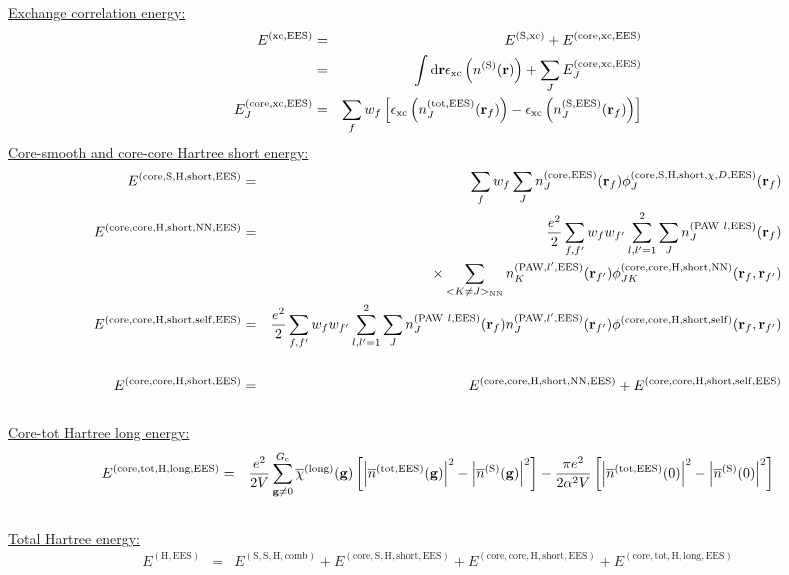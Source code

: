 \documentclass[paper=a4, fontsize=11pt]{article} %
\numberwithin{equation}{section} %
\numberwithin{figure}{section} %
\numberwithin{table}{section} %
\newcommand{\ol}{\overline}
\newcommand{\bg}{{\bf{g}}}
\newcommand{\br}{{\bf{r}}}
\newcommand{\rS}{{\mathrm{S}}}
\newcommand{\rEES}{{\mathrm{EES}}}
\newcommand{\rxc}{{\mathrm{xc}}}
\newcommand{\rcore}{{\mathrm{core}}}
\newcommand{\rNN}{{\mathrm{NN}}}
\newcommand{\rself}{{\mathrm{self}}}
\newcommand{\rshort}{{\mathrm{short}}}
\newcommand{\rlong}{{\mathrm{long}}}
\newcommand{\rP}{{\mathrm{PAW}}}
\newcommand{\rd}{{\mathrm{d}}}
\newcommand{\rH}{{\mathrm{H}}}
\newcommand{\rcomb}{{\mathrm{comb}}}
\newcommand{\rtot}{{\mathrm{tot}}}
\newcommand{\Gc}{{G_{\mathrm{c}}}}
\begin{document}
\underline{Exchange correlation energy:}
\begin{eqnarray}
E^{(\rxc,\rEES)} 
&=& E^{(\rS,\rxc)} + E^{(\rcore,\rxc,\rEES)}\\
&=& \int \rd\br \epsilon_{\rxc}\left(n^{(\rS)}(\br)\right) + \sum_J E_J^{(\rcore,\rxc,\rEES)} \\
E_J^{(\rcore,\rxc,\rEES)}
&=& \sum_f w_f \left[\epsilon_{\rxc}
\left(n^{(\rtot,\rEES)}_J(\br_f)\right)-\epsilon_{\rxc}\left(n_J^{(\rS,\rEES)}(\br_f)\right)\right] 
\end{eqnarray}
\underline{Core-smooth and core-core Hartree short energy:}
\begin{eqnarray}
E^{(\rcore,\rS,\rH,\rshort,\rEES)}
&=& \sum_f w_f \sum_J n_J^{(\rcore,\rEES)}(\br_f) \phi_J^{(\rcore,\rS,\rH,\rshort,\chi,D,\rEES)}(\br_f)\\
E^{(\rcore,\rcore,\rH,\rshort,\rNN,\rEES)}
&=& \frac{e^2}{2}\sum_{f,f'} w_f w_{f'} \sum_{l,l'=1}^2 \sum_J n_J^{(\rP\ l,\rEES)}(\br_f)\\
&&\times \sum_{<K \neq J>_\rNN}n_K^{(\rP,l',\rEES)}(\br_{f'}) \phi_{JK}^{(\rcore,\rcore,\rH,\rshort,\rNN)}(\br_f,\br_{f'})\\
E^{(\rcore,\rcore,\rH,\rshort,\rself,\rEES)}
&=& \frac{e^2}{2}\sum_{f,f'} w_f w_{f'} \sum_{l,l'=1}^2\sum_J n_J^{(\rP\ l,\rEES)}(\br_f) n_J^{(\rP,l',\rEES)}(\br_{f'})\phi^{(\rcore,\rcore,\rH,\rshort,\rself)}(\br_f,\br_{f'})\nonumber\\
\\
E^{(\rcore,\rcore,\rH,\rshort,\rEES)} &=&  E^{(\rcore,\rcore,\rH,\rshort,\rNN,\rEES)} + E^{(\rcore,\rcore,\rH,\rshort,\rself,\rEES)}
\end{eqnarray}\\
\underline{Core-tot Hartree long energy:}
\begin{eqnarray}
E^{(\rcore,\rtot,\rH,\rlong,\rEES)}&=& \frac{e^2}{2V} \sum_{\bg \neq 0}^\Gc \ol \chi^{(\rlong)} (\bg)\left[\left|\ol{n}^{(\rtot,\rEES)}(\bg)\right|^2 - \left|\ol{n}^{(\rS)}(\bg)\right|^2 \right] - \frac{\pi e^2}{2\alpha^2 V} \left[\left|\ol{n}^{(\rtot,\rEES)}(0)\right|^2 - \left|\ol{n}^{(\rS)}(0)\right|^2 \right]\nonumber\\
&\ &
\end{eqnarray}
\underline{Total Hartree energy:}
\begin{eqnarray}
E^{(\rH,\rEES)} &=& E^{(\rS,\rS,\rH,\rcomb)} + E^{(\rcore,\rS,\rH,\rshort,\rEES)} + E^{(\rcore,\rcore,\rH,\rshort,\rEES)} + E^{(\rcore,\rtot,\rH,\rlong,\rEES)}
\end{eqnarray}
\end{document}
